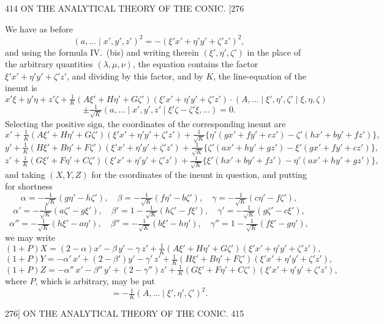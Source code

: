 \documentclass[11pt]{article}
\begin{document}
\begin{center}
414 \hfill ON THE ANALYTICAL THEORY OF THE CONIC. \hfill \textsc{[276}
\end{center}

We have as before
\[ (a,\dots \mid x',y',z')^{2}=-(\xi' x'+\eta' y'+\zeta' z')^{2}, \]
and using the formula \textsc{IV.}~(bis) and writing therein $(\xi',\eta',\zeta')$ in the place of the
arbitrary quantities $(\lambda,\mu,\nu)$, the equation contains the factor $\xi' x'+\eta' y'+\zeta' z'$, and
dividing by this factor, and by $K$, the line-equation of the ineunt is
\[ x'\xi+y'\eta+z'\zeta+\tfrac{1}{K}(A\xi'+H\eta'+G\zeta')(\xi' x'+\eta' y'+\zeta' z')\cdot(A,\dots \mid \xi',\eta',\zeta' \mid \xi,\eta,\zeta) \]
\[ \pm\tfrac{1}{\sqrt{K}}(a,\dots \mid x',y',z' \mid \xi'\zeta-\zeta'\xi,\dots)=0. \]
Selecting the positive sign, the coordinates of the corresponding ineunt are
\[ x'+\tfrac{1}{K}(A\xi'+H\eta'+G\zeta')(\xi' x'+\eta' y'+\zeta' z')+\tfrac{1}{\sqrt{K}}\bigl\{\eta'(gx'+fy'+cz')-\zeta'(hx'+by'+fz')\bigr\}, \]
\[ y'+\tfrac{1}{K}(H\xi'+B\eta'+F\zeta')(\xi' x'+\eta' y'+\zeta' z')+\tfrac{1}{\sqrt{K}}\bigl\{\zeta'(ax'+hy'+gz')-\xi'(gx'+fy'+cz')\bigr\}, \]
\[ z'+\tfrac{1}{K}(G\xi'+F\eta'+C\zeta')(\xi' x'+\eta' y'+\zeta' z')+\tfrac{1}{\sqrt{K}}\bigl\{\xi'(hx'+by'+fz')-\eta'(ax'+hy'+gz')\bigr\}, \]
and taking $(X,Y,Z)$ for the coordinates of the ineunt in question, and putting for
shortness
\[ \alpha=-\tfrac{1}{\sqrt{K}}(g\eta'-h\zeta'),\quad \beta=-\tfrac{1}{\sqrt{K}}(f\eta'-b\zeta'),\quad \gamma=-\tfrac{1}{\sqrt{K}}(c\eta'-f\zeta'), \]
\[ \alpha'=-\tfrac{1}{\sqrt{K}}(a\zeta'-g\xi'),\quad \beta'=1-\tfrac{1}{\sqrt{K}}(h\zeta'-f\xi'),\quad \gamma'=-\tfrac{1}{\sqrt{K}}(g\zeta'-c\xi'), \]
\[ \alpha''=-\tfrac{1}{\sqrt{K}}(h\xi'-a\eta'),\quad \beta''=-\tfrac{1}{\sqrt{K}}(b\xi'-h\eta'),\quad \gamma''=1-\tfrac{1}{\sqrt{K}}(f\xi'-g\eta'), \]
we may write
\[ (1+P)X = (2-\alpha)x'- \beta\,y'- \gamma\,z'+\tfrac{1}{K}(A\xi'+H\eta'+G\zeta')(\xi' x'+\eta' y'+\zeta' z'), \]
\[ (1+P)Y = -\alpha'\,x'+(2-\beta')y'- \gamma'\,z'+\tfrac{1}{K}(H\xi'+B\eta'+F\zeta')(\xi' x'+\eta' y'+\zeta' z'), \]
\[ (1+P)Z = -\alpha''\,x'-\beta''\,y'+(2-\gamma'')z'+\tfrac{1}{K}(G\xi'+F\eta'+C\zeta')(\xi' x'+\eta' y'+\zeta' z'), \]
where $P$, which is arbitrary, may be put
\[ =-\tfrac{1}{K}(A,\dots \mid \xi',\eta',\zeta')^{2}. \]

\begin{center}
\textsc{276]} \hfill ON THE ANALYTICAL THEORY OF THE CONIC. \hfill 415
\end{center}
\end{document}

